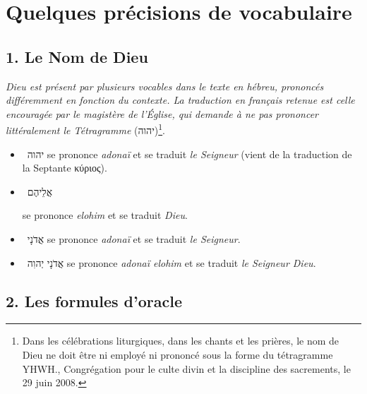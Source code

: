 \noindent
\section*{Quelques précisions de vocabulaire}

\subsection*{1. Le Nom de Dieu}
\emph{Dieu est présent par plusieurs vocables dans le texte en hébreu, prononcés différemment en fonction du contexte. La traduction en français retenue est celle encouragée par le magistère de l'Église, qui demande à ne pas prononcer littéralement le Tétragramme} (\texthebrew{יהוה})\footnote{\og{}Dans les célébrations liturgiques, dans les chants et les prières, le nom de Dieu ne doit être ni employé ni prononcé sous la forme du tétragramme YHWH.\fg{}, Congrégation pour le culte divin et la discipline des sacrements, le 29 juin 2008.}.\par
\begin{itemize}[label=] 
\item ~\texthebrew{יהוה} se prononce \textit{adonaï} et se traduit \textit{le Seigneur} (vient de la traduction de la Septante \textgreek{κύριος}).
\item ~\texthebrew{אֲלֵיהֶם} \raggedright se prononce \textit{elohim} et se traduit \textit{Dieu}.
\item ~\texthebrew{אֲדֹנָי} se prononce \textit{adonaï} et se traduit \textit{le Seigneur}.
\item ~\texthebrew{אֲדֹנָי יְהוִה} se prononce \textit{adonaï elohim} et se traduit \textit{le Seigneur Dieu}.
\end{itemize}

\subsection*{2. Les formules d'oracle}